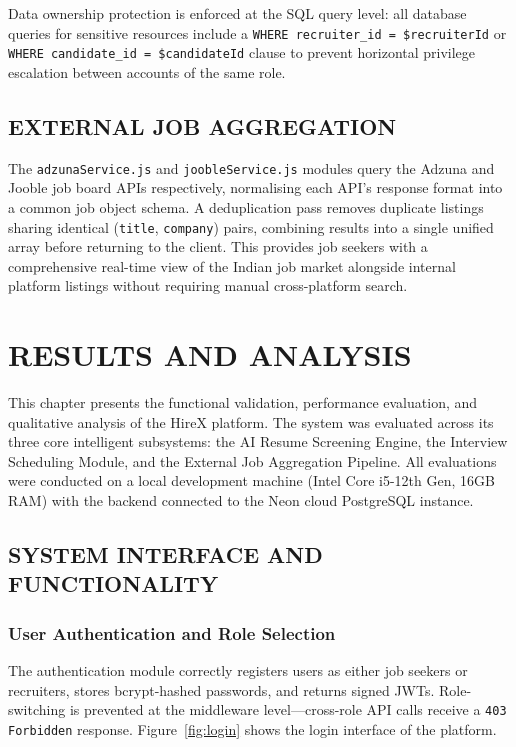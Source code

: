 \documentclass[12pt,a4paper]{report}
\begin{document}
Data ownership protection is enforced at the SQL query level: all database queries for sensitive resources include a \texttt{WHERE recruiter\_id = \$recruiterId} or \texttt{WHERE candidate\_id = \$candidateId} clause to prevent horizontal privilege escalation between accounts of the same role.

\section{EXTERNAL JOB AGGREGATION}

The \texttt{adzunaService.js} and \texttt{joobleService.js} modules query the Adzuna and Jooble job board APIs respectively, normalising each API's response format into a common job object schema. A deduplication pass removes duplicate listings sharing identical (\texttt{title}, \texttt{company}) pairs, combining results into a single unified array before returning to the client. This provides job seekers with a comprehensive real-time view of the Indian job market alongside internal platform listings without requiring manual cross-platform search.

\chapter{RESULTS AND ANALYSIS}

This chapter presents the functional validation, performance evaluation, and qualitative analysis of the HireX platform. The system was evaluated across its three core intelligent subsystems: the AI Resume Screening Engine, the Interview Scheduling Module, and the External Job Aggregation Pipeline. All evaluations were conducted on a local development machine (Intel Core i5-12th Gen, 16GB RAM) with the backend connected to the Neon cloud PostgreSQL instance.

\section{SYSTEM INTERFACE AND FUNCTIONALITY}

\subsection{User Authentication and Role Selection}
The authentication module correctly registers users as either job seekers or recruiters, stores bcrypt-hashed passwords, and returns signed JWTs. Role-switching is prevented at the middleware level---cross-role API calls receive a \texttt{403 Forbidden} response. Figure~\ref{fig:login} shows the login interface of the platform.
\end{document}
